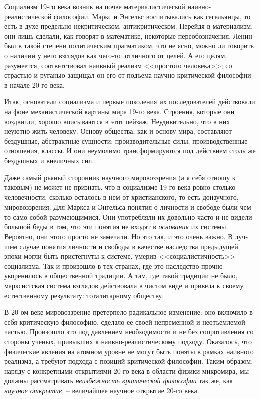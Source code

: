 \documentclass{book}
\begin{document}
Социализм 19-го века возник на почве материалистической наивно-реалистической философии. Маркс и Энгельс воспитывались как гегельянцы, то есть в духе предельно некритическом, антикритическом. Перейдя в материализм, они лишь сделали, как говорят в математике, некоторые переобозначения. Ленин был в такой степени политическим прагматиком, что не ясно, можно ли говорить о наличии у него взглядов как чего-то .отличного от целей. А его целям, разумеется, соответствовал наивный реализм <<простого человека>>; со страстью и руганью защищал он его от подъема научно-критической фило­софии в начале 20-го века.

Итак, основатели социализма и первые поколения их после­дователей действовали на фоне механистической картины мира 19-го века. Строения, которые они воздвигли, хорошо вписы­ваются в этот пейзаж. Неудивительно, что в них неуютно жить человеку. Основу общества, как и основу мира, составляют бездушные, абстрактные сущности: производительные силы, производственные отношения, классы. И они неумолимо транс­формируются под действием столь же бездушных и внеличных сил.

Даже самый рьяный сторонник научного мировоззрения (а я себя отношу к таковым) не может не признать, что в социа­лизме 19-го века ровно столько человечности, сколько оста­лось в нем от христианского, то есть донаучного, мировоззре­ния. Для Маркса и Энгельса понятия о личности и свободе были чем-то само собой разумеющимися. Они употребляли их довольно часто и не видели большой беды в том, что эти понятия не входят в \textit{основания}  их системы. Вероятно, они этого просто не замечали. Но это так, и это очень важно. В луч­шем случае понятия личности и свободы в качестве наследства предыдущей эпохи могли быть пристегнуты к системе, умерив <<социалистичность>> социализма. Так и произошло в тех стра­нах, где это наследство прочно укоренилось в общественной традиции. А там, где такой традиции не было, марксистская си­стема взглядов действовала в чистом виде и привела к своему естественному результату: тоталитарному обществу.

В 20-ом веке мировоззрение претерпело радикальное изме­нение: оно включило в себя критическую философию, сдела­ло ее своей непременной и неотъемлемой частью. Произошло это под давлением необходимости и не без сопротивления со стороны ученых, привыкших к наивно-реалистическому подходу. Оказалось, что физические явления на атомном уровне не могут быть поняты в рамках наивного реализма, а требуют подхода с позиций критической философии. Таким образом, наряду с конкретными открытиями 20-го века в области физики микромира, мы должны рассматривать \textit{неизбежность критиче­ской философии}  так же, как \textit{научное открытие}, --  величайшее научное открытие 20-го века.
\end{document}
